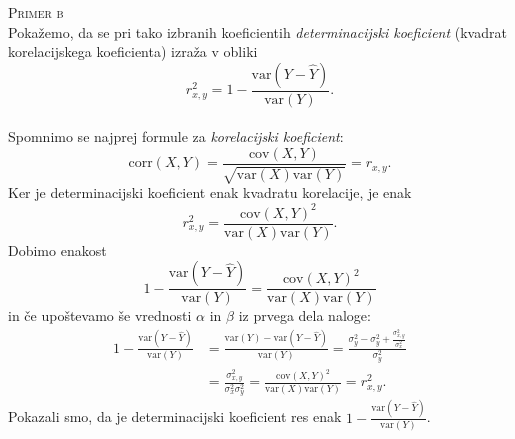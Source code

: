 \documentclass[a4paper,12pt]{article}
\begin{document}
\noindent
\textsc{Primer b}
\\
Pokažemo, da se pri tako izbranih koeficientih \textit{determinacijski koeficient} (kvadrat korelacijskega koeficienta) izraža v obliki
$$ r_{x,y}^2 = 1 - \frac{\text{var}(Y - \hat{Y})}{\text{var}(Y)}. $$
\\
Spomnimo se najprej formule za \textit{korelacijski koeficient}: 
$$ \text{corr}(X,Y) = \frac{\text{cov}(X,Y)}{\sqrt{\text{var}(X) \text{var}(Y)}} = r_{x,y}. $$
Ker je determinacijski koeficient enak kvadratu korelacije, je enak
$$ r_{x,y}^2 = \frac{\text{cov}(X,Y)^2}{\text{var}(X) \text{var}(Y)}. $$
Dobimo enakost
$$ 1 - \frac{\text{var}(Y - \hat{Y})}{\text{var}(Y)} = \frac{\text{cov}(X,Y)^2}{\text{var}(X) \text{var}(Y)} $$
in če upoštevamo še vrednosti $\alpha$ in $\beta$ iz prvega dela naloge:
\begin{align*} 
    1 - \frac{\text{var}(Y - \hat{Y})}{\text{var}(Y)} &= \frac{\text{var}(Y) - \text{var}(Y - \hat{Y})}{\text{var}(Y)} = \frac{\sigma_y^2 - \sigma_y^2 + \frac{\sigma_{x,y}^2}{\sigma_x^2}}{\sigma_y^2} 
    \\
    &= \frac{\sigma_{x,y}^2}{\sigma_x^2 \sigma_y^2} = \frac{\text{cov}(X,Y)^2}{\text{var}(X) \text{var}(Y)} = r_{x,y}^2. 
\end{align*}
Pokazali smo, da je determinacijski koeficient res enak $1 - \frac{\text{var}(Y - \hat{Y})}{\text{var}(Y)}$.
\end{document}
